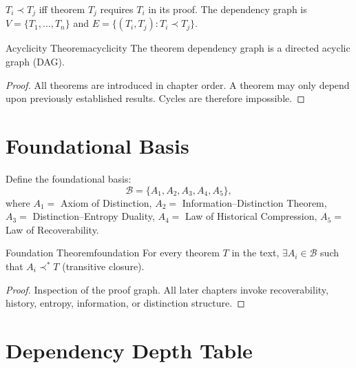 \documentclass[12pt,twoside,openright]{book}
\begin{document}
$T_i \prec T_j$ iff theorem $T_j$ requires $T_i$
in its proof. The dependency graph is
$V = \{T_1, \ldots, T_n\}$ and
$E = \{(T_i, T_j) : T_i \prec T_j\}$.

\begin{theorem}{Acyclicity Theorem}{acyclicity}
  The theorem dependency graph is a directed acyclic
  graph (DAG).
\end{theorem}

\begin{proof}
  All theorems are introduced in chapter order.
  A theorem may only depend upon previously established
  results. Cycles are therefore impossible.
\end{proof}

\section{Foundational Basis}

Define the foundational basis:
\[
  \mathcal{B}
  = \{A_1, A_2, A_3, A_4, A_5\},
\]
where $A_1 =$ Axiom of Distinction,
$A_2 =$ Information--Distinction Theorem,
$A_3 =$ Distinction--Entropy Duality,
$A_4 =$ Law of Historical Compression,
$A_5 =$ Law of Recoverability.

\begin{theorem}{Foundation Theorem}{foundation}
  For every theorem $T$ in the text, $\exists A_i \in
  \mathcal{B}$ such that $A_i \prec^* T$
  (transitive closure).
\end{theorem}

\begin{proof}
  Inspection of the proof graph. All later chapters
  invoke recoverability, history, entropy, information,
  or distinction structure.
\end{proof}

\section{Dependency Depth Table}
\end{document}
